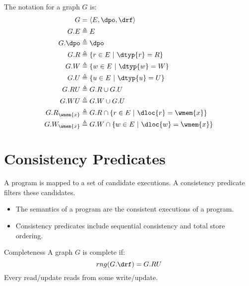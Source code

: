 The notation for a graph $G$ is:
\[\begin{split}
    G & = \langle E, \dpo, \drf \rangle \\
    G.E & \triangleq E \\
    G.\dpo & \triangleq \dpo \\
    G.R & \triangleq \{ r \in E \ | \ \dtyp{r} = R\} \\
    G.W & \triangleq \{ w \in E \ | \ \dtyp{w} = W\} \\
    G.U & \triangleq \{ u \in E \ | \ \dtyp{u} = U\} \\
    G.RU & \triangleq G.R \cup G.U \\
    G.WU & \triangleq G.W \cup G.U \\
    G.R_{\wmem{x}} &  \triangleq G.R \cap \{r \in E \ | \ \dloc{r} = \wmem{x}\} \\
    G.W_{\wmem{x}} &  \triangleq G.W \cap \{w \in E \ | \ \dloc{w} = \wmem{x}\} \\
\end{split}\]

\section{Consistency Predicates}
A program is mapped to a set of candidate executions. A consistency predicate filters these candidates.
\begin{itemize}
    \item The semantics of a program are the consistent executions of a program.
    \item Consistency predicates include sequential consistency and total store ordering.
\end{itemize}

\begin{definitionbox}{Completeness}
    A graph $G$ is complete if:
    \[rng(G.\drf) = G.RU\]
    Every read/update reads from some write/update. 
\end{definitionbox}

